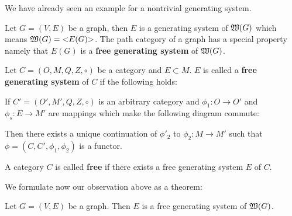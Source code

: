We have already seen an example for a nontrivial generating system.

Let $G=(V,E)$ be a graph, then $E$ is a generating system of $\mbox{$\mathfrak{W}(G)$}$
which means $\mbox{$\mathfrak{W}(G)$} = \mbox{${<}E(G){>}$}$. The path category of a graph
has a special property namely that $E(G)$ is a {\bf free generating system} of
$\mbox{$\mathfrak{W}(G)$}$.

\bigskip
\begin{definition}
Let $C = (O, M, Q, Z, \circ)$ be a category and $E \subset M$. $E$ is called a
{\bf free generating system} of $C$ if the following holds:

If $C' = (O', M', Q, Z, \circ)$ is an arbitrary category and $\phi_1 : O \to O'$
and $\phi_s : E \to M'$ are mappings which make the following diagram commute:

\begin{center}
\end{center}

Then there exists a unique continuation of $\phi'_2$ to $\phi_2 : M \to M'$ such
that $\phi = (C, C', \phi_1, \phi_2)$ is a functor.
\end{definition}

\begin{definition}
A category $C$ is called {\bf free} if there exists a free generating system $E$
of $C$.
\end{definition}

We formulate now our observation above as a theorem:

\begin{theorem}
Let $G=(V, E)$ be a graph. Then $E$ is a free generating system of
$\mbox{$\mathfrak{W}(G)$}$.
\end{theorem}



